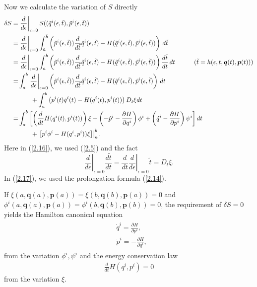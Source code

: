 \documentclass[a4paper,a4paper]{article}
\def\q{\boldsymbol{q}}
\def\p{\boldsymbol{p}}
\begin{document}
Now we calculate the variation of $S$ directly
\begin{align}
\delta S=&\left.\frac{d}{d\epsilon}\right|_{\epsilon=0}
       S((\tilde{q}^{i}(\epsilon, \tilde{t}), \tilde{p}^{i}(\epsilon, \tilde{t}))
           \notag\\
        =&\left.\frac{d}{d\epsilon}\right|_{\epsilon=0}\int_{\tilde{a}}^{\tilde{b}}
           \left(\tilde{p}^{i}(\epsilon, \tilde{t})) \frac{d}{d\tilde{t}}
           \tilde{q}^{i}(\epsilon, \tilde{t})-H(\tilde{q}^{i}(\epsilon, \tilde{t}),
           \tilde{p}^{i}(\epsilon, \tilde{t}))\right)\,d\tilde{t}\notag\\
       =&\left.\frac{d}{d\epsilon}\right|_{\epsilon=0}\int_{a}^{b}
           \left(\tilde{p}^{i}(\epsilon, \tilde{t})) \frac{d}{d\tilde{t}}
           \tilde{q}^{i}(\epsilon, \tilde{t})-H(\tilde{q}^{i}(\epsilon, \tilde{t}),
           \tilde{p}^{i}(\epsilon, \tilde{t}))\right)\frac{d\tilde{t}}{dt}\,dt
          \quad\quad\quad (\tilde{t}=h(\epsilon, t, \q(t),\p(t)))\notag\\
        =&\int_{a}^{b}\left.\frac{d}{d\epsilon}\right|_{\epsilon=0}
           \left(\tilde{p}^{i}(\epsilon, \tilde{t})) \frac{d}{d\tilde{t}}
           \tilde{q}^{i}(\epsilon, \tilde{t})-H(\tilde{q}^{i}(\epsilon, \tilde{t}),
           \tilde{p}^{i}(\epsilon, \tilde{t})\right)\,dt\notag\\
           & \quad\quad+\int_{a}^{b}\left(p^{i}(t)\dot{q}^{i}(t)-H(q^{i}(t), p^{i}(t))
            \right) D_{t}\xi dt \label{2.16}\\
         =&\int_{a}^{b}\left[\left(\frac{d}{dt}H(q^{i}(t), p^{i}(t))\right)\xi
          +\left(-\dot{p}^{i}-\frac{\partial H}{\partial q^{i}}\right)\phi^{i}
          +\left(\dot{q}^{i}-\frac{\partial H}{\partial p^{i}}\right)
          \psi^{i}\right]dt\notag \\
          &\quad \quad
           +\left.\left[p^{i}\phi^{i}-H(q^{i}, p^{i}))\xi\right]\right|_{a}^{b}.
           \label{2.17}
\end{align}
\noindent
Here in (\ref{2.16}), we used (\ref{2.5}) and the fact
 \[
  \left.\frac{d}{d\epsilon}\right|_{\epsilon=0}
  \frac{d\tilde{t}}{dt}=\frac{d}{dt}\left.\frac{d}{d\epsilon}\right|_{\epsilon=0}
 \tilde{t}=D_{t}\xi.
\]
 In (\ref{2.17}), we used the prolongation formula (\ref{2.14}).

If $\xi(a, \q(a), \p(a))=\xi(b, \q(b), \p(a))=0$ and  
$\phi^{i}(a, \q(a), \p(a))=\phi^{i}(b, \q(b), \p(b))=0$,
 the requirement of $\delta S
=0$ yields the Hamilton canonical equation
\begin{align}
\begin{split}
  & \dot{q}^{i}=\frac{\partial H}{\partial p^{i}},\\
  & \dot{p}^{i}=-\frac{\partial H}{\partial q^{i}},
\end{split} \label{2.18}
\end{align}
from the  variation $\phi^{i}, \psi^{i}$ and
the energy conservation law
\begin{align}
 \frac{d}{dt}H(q^{i}, p^{i})=0 \label{2.19}
\end{align}
from the variation  $\xi$.
\end{document}
